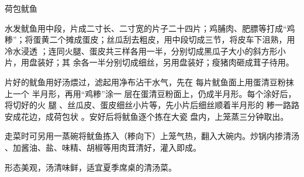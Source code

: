 \begin{recipe}{荷包鱿鱼}

\ingredients



\preparation

\step 水发鱿鱼用中段，片成二寸长、二寸宽的片子二十四片；鸡脯肉、肥膘等打成“鸡
糁”；将蛋黄二个摊成蛋皮；丝瓜刮去粗皮，用中段切成三节，将皮车下沮熟，用冷水浸透
；连同火腿、蛋皮共三样各用一半，分别切成黑瓜子大小的斜方形小片，用盘装好；其
余各一半分别切成细丝，另用盘装好；瘦猪肉砸成茸子待用。

片好的鱿鱼用好汤煨过，滤起用净布沾干水气，先在 每片鱿鱼面上用蛋清豆粉抹上一个
半月形，再用“鸡糁”涂一 层在蛋清豆粉面上，仍成半月形。每个涂好后，将切好的火 腿
、丝瓜皮、蛋皮细丝小片等，先小片后细丝顺着半月形的 糁一路路安成花边，成荷包状
。安好后将鱿鱼逐个拣在大瓷 盘内，上笼蒸三分钟取出。

\step 走菜时可另用一蒸碗将鱿鱼拣入（糁向下）上笼气热，翻入大碗内。炒锅内掺清汤
、加酱油、盐、味精、胡椒等用肉茸清好，灌入即成。

\features

形态美观，汤清味鲜，适宜夏季席桌的清汤菜。

\end{recipe}

